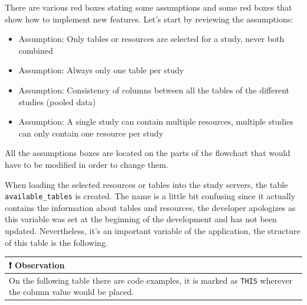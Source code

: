 \documentclass[
]{book}
\providecommand{\tightlist}{%
  \setlength{\itemsep}{0pt}\setlength{\parskip}{0pt}}
\begin{document}
There are various red boxes stating some assumptions and some red boxes that show how to implement new features. Let's start by reviewing the assumptions:

\begin{itemize}
\tightlist
\item
  Assumption: Only tables or resources are selected for a study, never both combined
\item
  Assumption: Always only one table per study
\item
  Assumption: Consistency of columns between all the tables of the different studies (pooled data)
\item
  Assumption: A single study can contain multiple resources, multiple studies can only contain one resource per study
\end{itemize}

All the assumptions boxes are located on the parts of the flowchart that would have to be modified in order to change them.

When loading the selected resources or tables into the study servers, the table \texttt{available\_tables} is created. The name is a little bit confusing since it actually contains the information about tables and resources, the developer apologizes as this variable was set at the beginning of the development and has not been updated. Nevertheless, it's an important variable of the application, the structure of this table is the following.

\begin{longtable}[]{@{}l@{}}
\toprule
\begin{minipage}[b]{0.97\columnwidth}\raggedright
❗ Observation\strut
\end{minipage}\tabularnewline
\midrule
\endhead
\begin{minipage}[t]{0.97\columnwidth}\raggedright
On the following table there are code examples, it is marked as \texttt{THIS} wherever the column value would be placed.\strut
\end{minipage}\tabularnewline
\bottomrule
\end{longtable}
\end{document}

